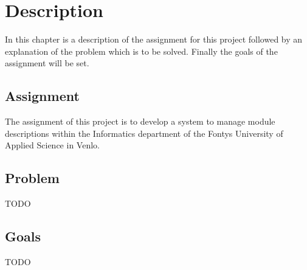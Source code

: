 \chapter{Description}
In this chapter is a description of the assignment for this project followed by an explanation 
of the problem which is to be solved. Finally the goals of the assignment will be set.

\section{Assignment}
The assignment of this project is to develop a system to manage module descriptions within the Informatics
department of the Fontys University of Applied Science in Venlo. 

\section{Problem}
TODO

\section{Goals}
TODO